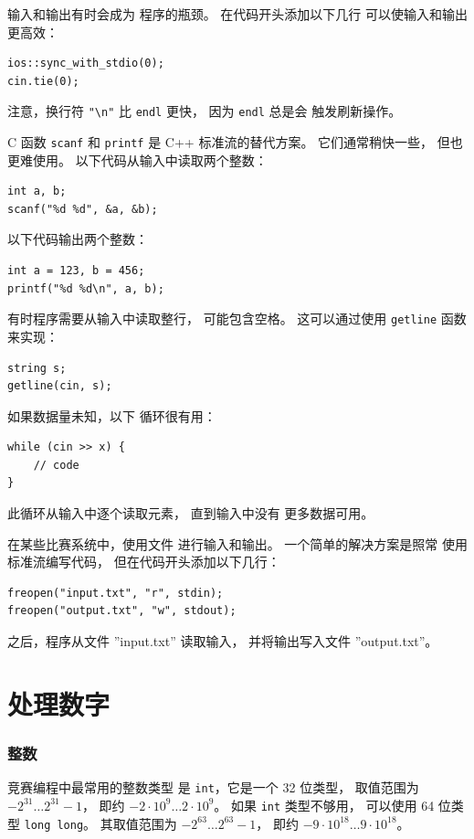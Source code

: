 输入和输出有时会成为
程序的瓶颈。
在代码开头添加以下几行
可以使输入和输出更高效：

\begin{lstlisting}
ios::sync_with_stdio(0);
cin.tie(0);
\end{lstlisting}

注意，换行符 \texttt{"\textbackslash n"}
比 \texttt{endl} 更快，
因为 \texttt{endl} 总是会
触发刷新操作。

C 函数 \texttt{scanf}
和 \texttt{printf} 是
C++ 标准流的替代方案。
它们通常稍快一些，
但也更难使用。
以下代码从输入中读取两个整数：
\begin{lstlisting}
int a, b;
scanf("%d %d", &a, &b);
\end{lstlisting}
以下代码输出两个整数：
\begin{lstlisting}
int a = 123, b = 456;
printf("%d %d\n", a, b);
\end{lstlisting}

有时程序需要从输入中读取整行，
可能包含空格。
这可以通过使用
\texttt{getline} 函数来实现：

\begin{lstlisting}
string s;
getline(cin, s);
\end{lstlisting}

如果数据量未知，以下
循环很有用：
\begin{lstlisting}
while (cin >> x) {
    // code
}
\end{lstlisting}
此循环从输入中逐个读取元素，
直到输入中没有
更多数据可用。

在某些比赛系统中，使用文件
进行输入和输出。
一个简单的解决方案是照常
使用标准流编写代码，
但在代码开头添加以下几行：
\begin{lstlisting}
freopen("input.txt", "r", stdin);
freopen("output.txt", "w", stdout);
\end{lstlisting}
之后，程序从文件 ''input.txt'' 读取输入，
并将输出写入文件
''output.txt''。

\section{处理数字}


\subsubsection{整数}

竞赛编程中最常用的整数类型
是 \texttt{int}，它是一个 32 位类型，
取值范围为 $-2^{31} \ldots 2^{31}-1$，
即约 $-2 \cdot 10^9 \ldots 2 \cdot 10^9$。
如果 \texttt{int} 类型不够用，
可以使用 64 位类型 \texttt{long long}。
其取值范围为 $-2^{63} \ldots 2^{63}-1$，
即约 $-9 \cdot 10^{18} \ldots 9 \cdot 10^{18}$。


